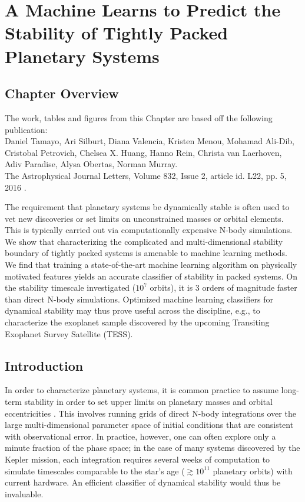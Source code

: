 \chapter[Stability of Planetary Systems]{A Machine Learns to Predict the Stability of Tightly Packed Planetary Systems}
\label{chap:Stability}

\section{Chapter Overview}
	\begin{center}
	\begin{minipage}[c]{4.75in}
	The work, tables and figures from this Chapter are based off the following publication:\\
	
	Daniel Tamayo, Ari Silburt, Diana Valencia, Kristen Menou, Mohamad Ali-Dib, Cristobal Petrovich, Chelsea X. Huang, Hanno Rein, Christa van Laerhoven, Adiv Paradise, Alysa Obertas, Norman Murray.\\
	The Astrophysical Journal Letters, Volume 832, Issue 2, article id. L22, pp. 5, 2016 \citep{Tamayo2016}.
	\vspace{2em}
	\end{minipage}
	\end{center}
	
The requirement that planetary systems be dynamically stable is often used to vet new discoveries or set limits on unconstrained masses or orbital elements. 
This is typically carried out via computationally expensive N-body simulations.
We show that characterizing the complicated and multi-dimensional stability boundary of tightly packed systems is amenable to machine learning methods. 
We find that training a state-of-the-art machine learning algorithm on physically motivated features yields an accurate classifier of stability in packed systems. 
On the stability timescale investigated ($10^7$ orbits), it is 3 orders of magnitude faster than direct N-body simulations. 
Optimized machine learning classifiers for dynamical stability may thus prove useful across the discipline, e.g., to characterize the exoplanet sample discovered by the upcoming Transiting Exoplanet Survey Satellite (TESS).

\section{Introduction}
In order to characterize planetary systems, it is common practice to assume long-term stability in order to set upper limits on planetary masses and orbital eccentricities \citep[e.g.][]{Lissauer2011, Steffen2013, Tamayo14b, Tamayo2015}.
This involves running grids of direct N-body integrations over the large multi-dimensional parameter space of initial conditions that are consistent with observational error.
In practice, however, one can often explore only a minute fraction of the phase space; in the case of many systems discovered by the Kepler mission, each integration requires several weeks of computation to simulate timescales comparable to the star's age ($\gtrsim 10^{11}$ planetary orbits) with current hardware.
An efficient classifier of dynamical stability would thus be invaluable.

